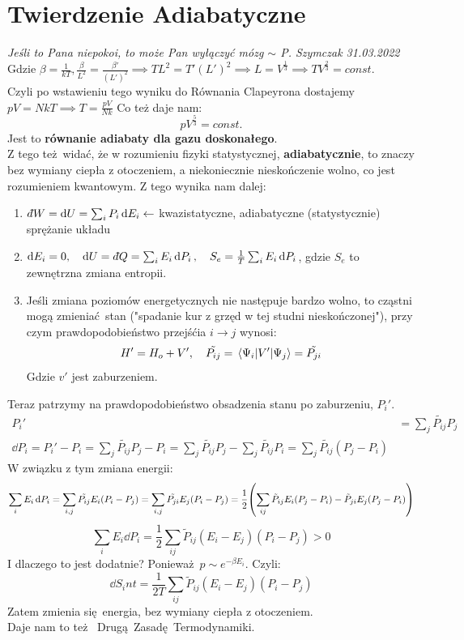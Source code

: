 \documentclass[12pt,a4paper]{report}
\newcommand{\subind}[2]{{\color{blue} #1\index{#2}}}
\renewcommand{\emph}{\textbf}
\newcommand{\dbar}{d\hspace*{-0.08em}\bar{}\hspace*{0.1em}}
\newenvironment{lecture}[1]{\par\medskip
   \noindent\chapter{#1} \rmfamily}{\medskip}
\begin{document}
\begin{lecture}{Twierdzenie Adiabatyczne}
\textit{Jeśli to Pana niepokoi, to może Pan wyłączyć mózg $\sim$ P. Szymczak 31.03.2022}
Gdzie $\beta = \frac{1}{kT}, \frac{\beta}{L^2} = \frac{\beta'}{(L')^2} \implies T L^2 = T' (L')^2 \implies L = V^{\frac13} \implies T V^{\frac23} = const.$\\
Czyli po wstawieniu tego wyniku do Równania Clapeyrona dostajemy $pV = NkT \implies T = \frac{pV}{Nk}$ Co też daje nam:
\[
    pV^{\frac53} = const.
\]
Jest to \emph{równanie adiabaty dla gazu doskonałego}.\\
Z tego też widać, że w rozumieniu fizyki statystycznej, \emph{adiabatycznie}, to znaczy bez wymiany ciepła z otoczeniem, a niekoniecznie nieskończenie wolno, co jest rozumieniem kwantowym.
Z tego wynika nam dalej:
\begin{enumerate}
    \item $\dbar W = \dd{U} = \sum_i P_i\dd{E_i} \gets$ kwazistatyczne, adiabatyczne (statystycznie) sprężanie układu
    \item $\dd{E_i} = 0 \qc \dd{U} = \dbar{Q} = \sum_i E_i \dd{P_i} \qc S_e = \frac{1}{T} \sum_i E_i \dd{P_i}$, gdzie $S_e$ to zewnętrzna zmiana entropii.
    \item Jeśli zmiana poziomów energetycznych nie następuje bardzo wolno, to cząstni mogą zmieniać stan ("spadanie kur z grzęd w tej studni nieskończonej"), przy czym prawdopodobieństwo przejśćia $i \to j$ wynosi:
    \[
        H' = H_o + V'\qc \tilde{P_{ij}} = \mel{\Psi_i}{V'}{\Psi_j} = \tilde{P_{ji}}
    \]
    Gdzie $v'$ jest zaburzeniem.
\end{enumerate}
Teraz patrzymy na prawdopodobieństwo obsadzenia stanu po zaburzeniu, $P_i'$.
\begin{align*}
    P_i' &= \sum_j \tilde{P_{ij}} P_j\\
    \dd{P_i} = P_i' - P_i = \sum_j \tilde{P_{ij}}P_j - P_i = \sum_j \tilde{P_{ij}}P_j - \sum_j \tilde{P_{ij}}P_i = \sum_j \tilde{P_{ij}}(P_j - P_i)
\end{align*}
W związku z tym zmiana energii:
\[
    \sum_i E_i\dd{P_i} = \sum_{i,j} \tilde{P_{ij}} E_i (P_i - P_j) = \sum_{i,j} \tilde{P_{ji}} E_j (P_i - P_j) = \frac12\qty(\sum_{ij} \tilde{P}_{ij} E_i (P_j-P_i) - \tilde{P}_{ji} E_j (P_j - P_i))
\]
\[
    \sum_i E_i \dd{P_i} = \frac12\sum_{ij}\tilde{P}_{ij}(E_i-E_j) (P_i-P_j) >0 
\]
I dlaczego to jest dodatnie? Ponieważ $p \sim e^{-\beta E_i}$. Czyli:
\[
    \dd{S_int} = \frac{1}{2T} \sum_{ij} \tilde{P}_{ij} (E_i-E_j) (P_i-P_j) 
\]
Zatem zmienia się energia, bez wymiany ciepła z otoczeniem. \\
Daje nam to też \subind{Drugą Zasadę Termodynamiki}{Zasada Termodynamiki!Druga}.\\

\end{lecture}
\end{document}
